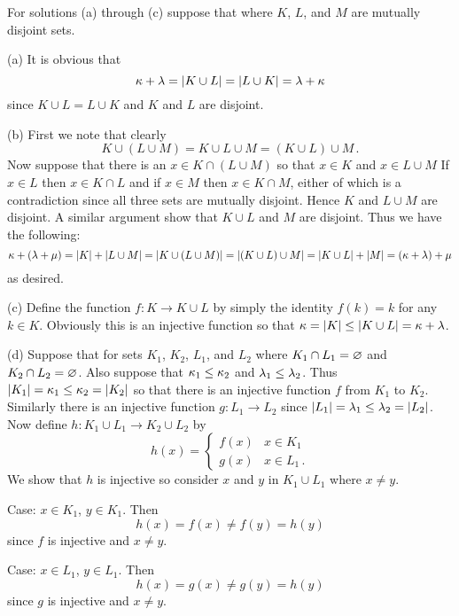 
\begin{solution}
    For solutions (a) through (c) suppose that
    where $K$, $L$, and $M$ are mutually disjoint sets.

    (a) It is obvious that
    $$
    \kappa + \lambda = |K \cup L| = |L \cup K| = \lambda + \kappa
    $$
    since $K \cup L = L \cup K$ and $K$ and $L$ are disjoint. \qedsymbol

    (b) First we note that clearly
    $$
    K \cup (L \cup M) = K \cup L \cup M = (K \cup L) \cup M \,.
    $$
    Now suppose that there is an $x \in K \cap (L \cup M)$ so that $x \in K$ and $x \in L \cup M$
    If $x \in L$ then $x \in K \cap L$ and if $x \in M$ then $x \in K \cap M$, either of which is a contradiction since all three sets are mutually disjoint.
    Hence $K$ and $L \cup M$ are disjoint.
    A similar argument show that $K \cup L$ and $M$ are disjoint.
    Thus we have the following:
    $$
    \kappa + (\lambda + \mu) = |K| + |L \cup M| = |K \cup (L \cup M)| = |(K \cup L) \cup M| = |K \cup L| + |M| = (\kappa + \lambda) + \mu
    $$
    as desired. \qedsymbol

    (c) Define the function $f: K \to K \cup L$ by simply the identity $f(k) = k$ for any $k \in K$.
    Obviously this is an injective function so that $\kappa = |K| \leq |K \cup L| = \kappa + \lambda$. \qedsymbol

    (d) Suppose that
    for sets $K_1$, $K_2$, $L_1$, and $L_2$ where $K_1 \cap L_1 = \varnothing$ and $K_2 \cap L_2 = \varnothing$.
    Also suppose that $\kappa_1 \leq \kappa_2$ and $\lambda_1 \leq \lambda_2$.
    Thus $|K_1| = \kappa_1 \leq \kappa_2 = |K_2|$ so that there is an injective function $f$ from $K_1$ to $K_2$.
    Similarly there is an injective function $g : L_1 \to L_2$ since $|L_1| = \lambda_1 \leq \lambda_2 = |L_2|$.
    Now define $h : K_1 \cup L_1 \to K_2 \cup L_2$ by
    $$
    h(x) = \begin{cases}
    	f(x) & x \in K_1 \\
        g(x) & x \in L_1 \,.
    \end{cases}
    $$
    We show that $h$ is injective so consider $x$ and $y$ in $K_1 \cup L_1$ where $x \neq y$.

    Case: $x \in K_1$, $y \in K_1$.
    Then
    $$
    h(x) = f(x) \neq f(y) = h(y)
    $$
    since $f$ is injective and $x \neq y$.

    Case: $x \in L_1$, $y \in L_1$.
    Then
    $$
    h(x) = g(x) \neq g(y) = h(y)
    $$
    since $g$ is injective and $x \neq y$.


\end{solution}
